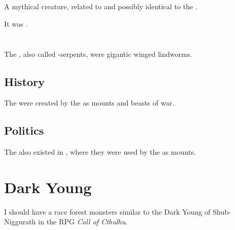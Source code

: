 \section{\Chimaera}
\index{\Chimaera}
A mythical creature, related to and possibly identical to the . 

It was . 















\section{\Carth}
\index{\carth}
The \carths, also called \carth-serpents, were gigantic winged lindworms. 









\subsection{History}
The \carths were created by the \ophidians as mounts and beasts of war. 









\subsection{Politics}
The \carths also existed in \Nyx, where they were used by the \resphain as mounts. 















\section{Dark Young}
I should have a race forest monsters similar to the Dark Young of Shub-Niggurath in the RPG \emph{Call of Cthulhu}. 















